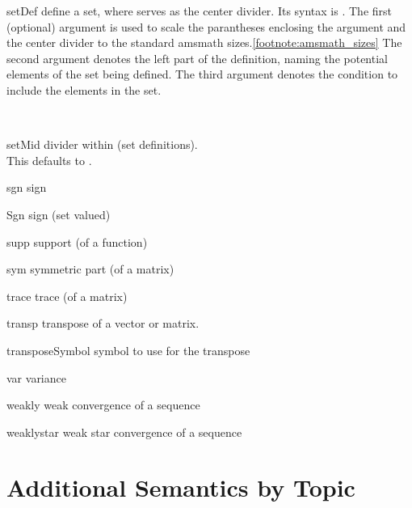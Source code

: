 \documentclass[english,a4paper,DIV=12,parskip=full,oneside]{scrartcl}
\begin{document}
\begin{commandlist}
      \item[setDef] define a set, where \codeCommand{\setMid} serves as the center divider.
            Its syntax is .
            The first (optional) argument is used to scale the parantheses enclosing the argument and the center divider to the standard amsmath sizes.\cref{footnote:amsmath_sizes}
            The second argument denotes the left part of the definition, naming the potential elements of the set being defined.
            The third argument denotes the condition to include the elements in the set.
            \par{}\\
            \par{}
        \item[setMid] divider within \codeCommand{\setDef} (set definitions).
            \\This defaults to \mathCodeExample{\setMid}.
        \item[sgn] sign \mathCodeExample{\sgn}
        \item[Sgn] sign (set valued) \mathCodeExample{\Sgn}
        \item[supp] support (of a function)  %
        \item[sym] symmetric part (of a matrix)  %
        \item[trace] trace (of a matrix)   %
        \item[transp] transpose of a vector or matrix.
            \par{}
        \item[transposeSymbol] symbol to use for the transpose
            \par\mathCodeExample{\transposeSymbol}
        \item[var] variance \mathCodeExample{\var}
        \item[weakly] weak convergence of a sequence \mathCodeExample{\weakly}
        \item[weaklystar] weak star convergence of a sequence \mathCodeExample{\weaklystar}
    \end{commandlist}

    \section{Additional Semantics by Topic}\label{sec:semantics-by-topic}
\end{document}
